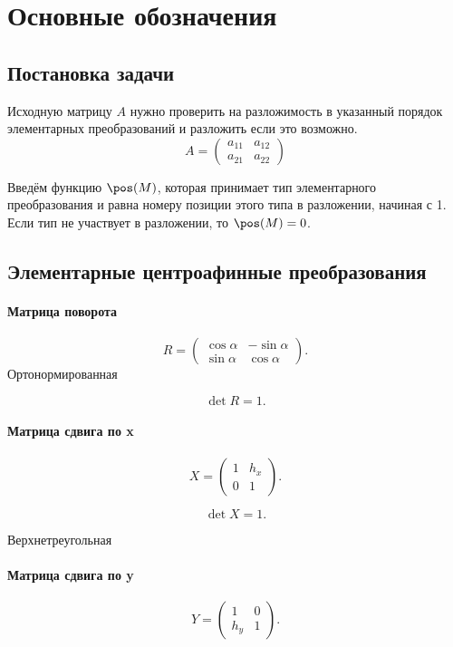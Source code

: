 \section{Основные обозначения}

\subsection{Постановка задачи}

Исходную матрицу $A$ нужно проверить на разложимость в указанный порядок элементарных преобразований и разложить если это возможно.
$$A = 
\begin{pmatrix}
	a_{11} & a_{12}\\
	a_{21} & a_{22}
\end{pmatrix}
$$


Введём функцию $\pos(M)$, которая принимает тип элементарного преобразования и равна номеру позиции этого типа в разложении, начиная с 1. Если тип не участвует в разложении, то $\pos(M) = 0$.

\subsection{Элементарные центроафинные преобразования}

\paragraph{Матрица поворота}

$$R = \begin{pmatrix}
	\cos\alpha & -\sin\alpha \\
	\sin\alpha & \cos\alpha
\end{pmatrix}.
$$
Ортонормированная

$$\det R = 1.$$


\paragraph{Матрица сдвига по x}
$$
X = \begin{pmatrix}
	1 & h_x \\
	0 & 1
\end{pmatrix}.
$$

$$\det X = 1.$$

Верхнетреугольная

\paragraph{Матрица сдвига по y}
$$
Y = \begin{pmatrix}
	1 & 0 \\
	h_y & 1
\end{pmatrix}.
$$

